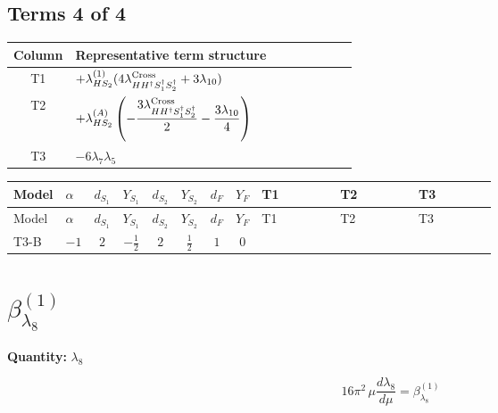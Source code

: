 \documentclass[8pt]{article}
\begin{document}
\begin{landscape}
\subsection*{Terms 4 of 4}
\begin{center}
\begin{tabular}{@{}c >{\raggedright\arraybackslash}p{0.82\linewidth}@{}}
\toprule
Column & Representative term structure \\
\midrule
T1 & \(\displaystyle +{\lambda_{HS_2}^{(1)}} (4 {\lambda_{H H^\dagger S_1^\dagger S_2^\dagger}^{\rm Cross}}+3 {\lambda_{10}})\) \\
\midrule
T2 & \(\displaystyle +{\lambda_{HS_2}^{(A)}} \left(-\frac{3 {\lambda_{H H^\dagger S_1^\dagger S_2^\dagger}^{\rm Cross}}}{2}-\frac{3 {\lambda_{10}}}{4}\right)\) \\
\midrule
T3 & \(\displaystyle -6 {\lambda_7} {\lambda_5}\) \\
\midrule
\bottomrule
\end{tabular}
\end{center}
\smallskip
\tiny
\begin{longtable}{@{}llcccccc >{\raggedright\arraybackslash}p{0.21\linewidth} >{\raggedright\arraybackslash}p{0.21\linewidth} >{\raggedright\arraybackslash}p{0.21\linewidth}@{}}
\toprule
Model & $\alpha$ & $d_{S_1}$ & $Y_{S_1}$ & $d_{S_2}$ & $Y_{S_2}$ & $d_F$ & $Y_F$ & T1 & T2 & T3 \\
\midrule
\endfirsthead
\toprule
Model & $\alpha$ & $d_{S_1}$ & $Y_{S_1}$ & $d_{S_2}$ & $Y_{S_2}$ & $d_F$ & $Y_F$ & T1 & T2 & T3 \\
\midrule
\endhead
T3-B & $-1$ & $2$ & $-\frac{1}{2}$ & $2$ & $\frac{1}{2}$ & $1$ & $0$ & \scriptsize\adjustbox{max width=\linewidth}{$\begin{gathered} +{\lambda_{HS_2}^{(1)}} (4 {\lambda_{H H^\dagger S_1^\dagger S_2^\dagger}^{\rm Cross}}+3 {\lambda_{10}})\end{gathered}$} & \scriptsize\adjustbox{max width=\linewidth}{$\begin{gathered} +{\lambda_{HS_2}^{(A)}} \left(-\frac{3 {\lambda_{H H^\dagger S_1^\dagger S_2^\dagger}^{\rm Cross}}}{2}-\frac{3 {\lambda_{10}}}{4}\right)\end{gathered}$} & \scriptsize\adjustbox{max width=\linewidth}{$\begin{gathered} -6 {\lambda_7} {\lambda_5}\end{gathered}$} \\
\midrule
\bottomrule
\end{longtable}
\clearpage
\section*{$\beta_{\lambda_{8}}^{(1)}$}
\noindent\textbf{Quantity: }$\lambda_{8}$\par\smallskip
\[16\pi^2\,\mu\frac{d \lambda_{8}}{d\mu}=\beta_{\lambda_{8}}^{(1)}\]

\end{landscape}
\end{document}
